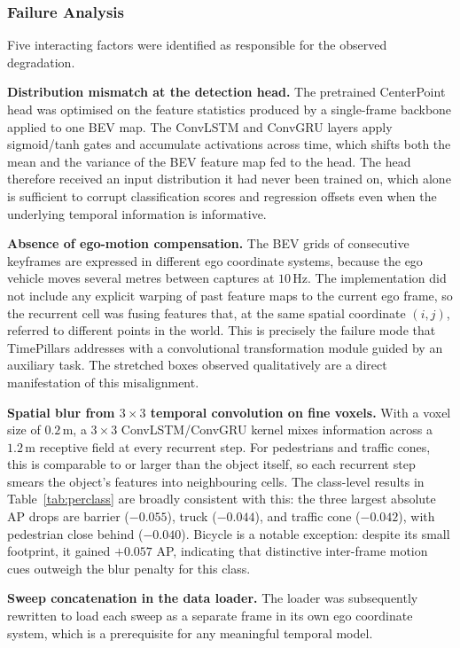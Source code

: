 \documentclass[12pt,a4paper]{report}
\begin{document}
\subsubsection{Failure Analysis}
\quad Five interacting factors were identified as responsible for
the observed degradation.

\textbf{Distribution mismatch at the detection head.} The
pretrained CenterPoint head was optimised on the feature statistics
produced by a single-frame backbone applied to one BEV map. The
ConvLSTM and ConvGRU layers apply sigmoid/tanh gates and accumulate
activations across time, which shifts both the mean and the
variance of the BEV feature map fed to the head. The head
therefore received an input distribution it had never been trained
on, which alone is sufficient to corrupt classification scores and
regression offsets even when the underlying temporal information
is informative.

\textbf{Absence of ego-motion compensation.} The BEV grids of
consecutive keyframes are expressed in different ego coordinate
systems, because the ego vehicle moves several metres between
captures at $10\,\text{Hz}$. The implementation did not include any
explicit warping of past feature maps to the current ego frame, so
the recurrent cell was fusing features that, at the same spatial
coordinate $(i, j)$, referred to different points in the world.
This is precisely the failure mode that TimePillars addresses with
a convolutional transformation module guided by an auxiliary task.
The stretched boxes observed qualitatively are a direct
manifestation of this misalignment.

\textbf{Spatial blur from $3 \times 3$ temporal convolution on fine
voxels.} With a voxel size of $0.2\,\text{m}$, a $3 \times 3$
ConvLSTM/ConvGRU kernel mixes information across a $1.2\,\text{m}$
receptive field at every recurrent step. For pedestrians and
traffic cones, this is comparable to or larger than the object
itself, so each recurrent step smears the object's features into
neighbouring cells. The class-level results in
Table~\ref{tab:perclass} are broadly consistent with this: the
three largest absolute AP drops are barrier ($-0.055$), truck
($-0.044$), and traffic cone ($-0.042$), with pedestrian close
behind ($-0.040$). Bicycle is a notable exception: despite its
small footprint, it gained $+0.057$ AP, indicating that
distinctive inter-frame motion cues outweigh the blur penalty for
this class.

\textbf{Sweep concatenation in the data loader.} The loader was subsequently
rewritten to load each sweep as a separate frame in its own ego
coordinate system, which is a prerequisite for any meaningful
temporal model.
\end{document}
